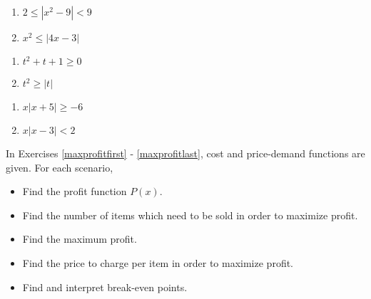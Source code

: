 \begin{multicols}{2}
\begin{enumerate}
\setcounter{enumi}{\value{HW}}

\item $2 \leq |x^{2} - 9| < 9$
\item $x^{2} \leq |4x - 3|$

\setcounter{HW}{\value{enumi}}
\end{enumerate}
\end{multicols}


\begin{multicols}{2}
\begin{enumerate}
\setcounter{enumi}{\value{HW}}

\item $t^{2} + t + 1 \geq 0$
\item  $t^2 \geq |t|$ 

\setcounter{HW}{\value{enumi}}
\end{enumerate}
\end{multicols}

\begin{multicols}{2}
\begin{enumerate}
\setcounter{enumi}{\value{HW}}

\item  $x |x+5| \geq -6$  
\item  $x |x-3| < 2$   \label{solveineququadlasta}

\setcounter{HW}{\value{enumi}}
\end{enumerate}
\end{multicols}




In Exercises \ref{maxprofitfirst} - \ref{maxprofitlast}, cost and price-demand functions are given.  For each scenario,


\begin{itemize}

\item  Find the profit function $P(x)$.

\item  Find the number of items which need to be sold in order to maximize profit.

\item  Find the maximum profit.

\item  Find the price to charge per item in order to maximize profit.

\item  Find and interpret break-even points.

\end{itemize}


